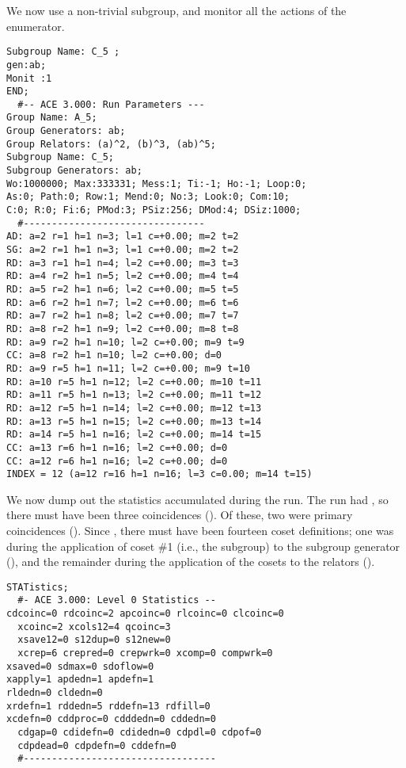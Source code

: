 We now use a non-trivial subgroup, and monitor all the actions of the
  enumerator.

\bv\begin{verbatim}
Subgroup Name: C_5 ;
gen:ab;
Monit :1
END;
  #-- ACE 3.000: Run Parameters ---
Group Name: A_5;
Group Generators: ab;
Group Relators: (a)^2, (b)^3, (ab)^5;
Subgroup Name: C_5;
Subgroup Generators: ab;
Wo:1000000; Max:333331; Mess:1; Ti:-1; Ho:-1; Loop:0;
As:0; Path:0; Row:1; Mend:0; No:3; Look:0; Com:10;
C:0; R:0; Fi:6; PMod:3; PSiz:256; DMod:4; DSiz:1000;
  #--------------------------------
AD: a=2 r=1 h=1 n=3; l=1 c=+0.00; m=2 t=2
SG: a=2 r=1 h=1 n=3; l=1 c=+0.00; m=2 t=2
RD: a=3 r=1 h=1 n=4; l=2 c=+0.00; m=3 t=3
RD: a=4 r=2 h=1 n=5; l=2 c=+0.00; m=4 t=4
RD: a=5 r=2 h=1 n=6; l=2 c=+0.00; m=5 t=5
RD: a=6 r=2 h=1 n=7; l=2 c=+0.00; m=6 t=6
RD: a=7 r=2 h=1 n=8; l=2 c=+0.00; m=7 t=7
RD: a=8 r=2 h=1 n=9; l=2 c=+0.00; m=8 t=8
RD: a=9 r=2 h=1 n=10; l=2 c=+0.00; m=9 t=9
CC: a=8 r=2 h=1 n=10; l=2 c=+0.00; d=0
RD: a=9 r=5 h=1 n=11; l=2 c=+0.00; m=9 t=10
RD: a=10 r=5 h=1 n=12; l=2 c=+0.00; m=10 t=11
RD: a=11 r=5 h=1 n=13; l=2 c=+0.00; m=11 t=12
RD: a=12 r=5 h=1 n=14; l=2 c=+0.00; m=12 t=13
RD: a=13 r=5 h=1 n=15; l=2 c=+0.00; m=13 t=14
RD: a=14 r=5 h=1 n=16; l=2 c=+0.00; m=14 t=15
CC: a=13 r=6 h=1 n=16; l=2 c=+0.00; d=0
CC: a=12 r=6 h=1 n=16; l=2 c=+0.00; d=0
INDEX = 12 (a=12 r=16 h=1 n=16; l=3 c=0.00; m=14 t=15)
\end{verbatim}\ev

We now dump out the statistics accumulated during the run.
The run had  \amp {}, so there must have been three
  coincidences ().
Of these, two were primary coincidences ().
Since , there must have been fourteen coset definitions;  one
  was during the application of coset \#1 (i.e., the subgroup) to the
  subgroup generator (), and the remainder during the
  application of the cosets to the relators ().

\bv\begin{verbatim}
STATistics;
  #- ACE 3.000: Level 0 Statistics --
cdcoinc=0 rdcoinc=2 apcoinc=0 rlcoinc=0 clcoinc=0
  xcoinc=2 xcols12=4 qcoinc=3
  xsave12=0 s12dup=0 s12new=0
  xcrep=6 crepred=0 crepwrk=0 xcomp=0 compwrk=0
xsaved=0 sdmax=0 sdoflow=0
xapply=1 apdedn=1 apdefn=1
rldedn=0 cldedn=0
xrdefn=1 rddedn=5 rddefn=13 rdfill=0
xcdefn=0 cddproc=0 cdddedn=0 cddedn=0
  cdgap=0 cdidefn=0 cdidedn=0 cdpdl=0 cdpof=0
  cdpdead=0 cdpdefn=0 cddefn=0
  #----------------------------------
\end{verbatim}\ev

